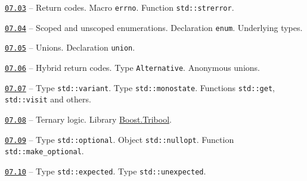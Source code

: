 \documentclass[a4paper,12pt]{article}
\renewenvironment{itemize}
{
    \begin{list}{\labelitemi}
    {
      \setlength{\topsep}{0pt}
      \setlength{\partopsep}{0pt}
      \setlength{\parskip}{0pt}
      \setlength{\itemsep}{0pt}
      \setlength{\parsep}{0pt}
      \setlength{\leftmargin}{14.5pt}
    }
}{\end{list}}
\begin{document}
\begin{itemize}

    \item \href{https://github.com/i-s-m-mipt/Education/blob/master/projects/examples/source/07.03.cpp}{\texttt{07.03}} -- Return codes. Macro \lstinline{errno}. Function \lstinline{std::strerror}.

    \smallskip

    \item \href{https://github.com/i-s-m-mipt/Education/blob/master/projects/examples/source/07.04.cpp}{\texttt{07.04}} -- Scoped and unscoped enumerations. Declaration \lstinline{enum}. Underlying types.

    \smallskip

    \item \href{https://github.com/i-s-m-mipt/Education/blob/master/projects/examples/source/07.05.cpp}{\texttt{07.05}} -- Unions. Declaration \lstinline{union}.

    \smallskip

    \item \href{https://github.com/i-s-m-mipt/Education/blob/master/projects/examples/source/07.06.cpp}{\texttt{07.06}} -- Hybrid return codes. Type \lstinline{Alternative}. Anonymous unions.

    \smallskip

    \item \href{https://github.com/i-s-m-mipt/Education/blob/master/projects/examples/source/07.07.cpp}{\texttt{07.07}} -- Type \lstinline{std::variant}. Type \lstinline{std::monostate}. Functions \lstinline{std::get}, \lstinline{std::visit} and others.

    \smallskip

    \item \href{https://github.com/i-s-m-mipt/Education/blob/master/projects/examples/source/07.08.cpp}{\texttt{07.08}} -- Ternary logic. Library \href{https://www.boost.org/doc/libs/1_85_0/doc/html/tribool.html}{Boost.Tribool}.

    \smallskip

    \item \href{https://github.com/i-s-m-mipt/Education/blob/master/projects/examples/source/07.09.cpp}{\texttt{07.09}} -- Type \lstinline{std::optional}. Object \lstinline{std::nullopt}. Function \lstinline{std::make_optional}.

    \smallskip

    \item \href{https://github.com/i-s-m-mipt/Education/blob/master/projects/examples/source/07.10.cpp}{\texttt{07.10}} -- Type \lstinline{std::expected}. Type \lstinline{std::unexpected}.

\end{itemize}
\end{document}
